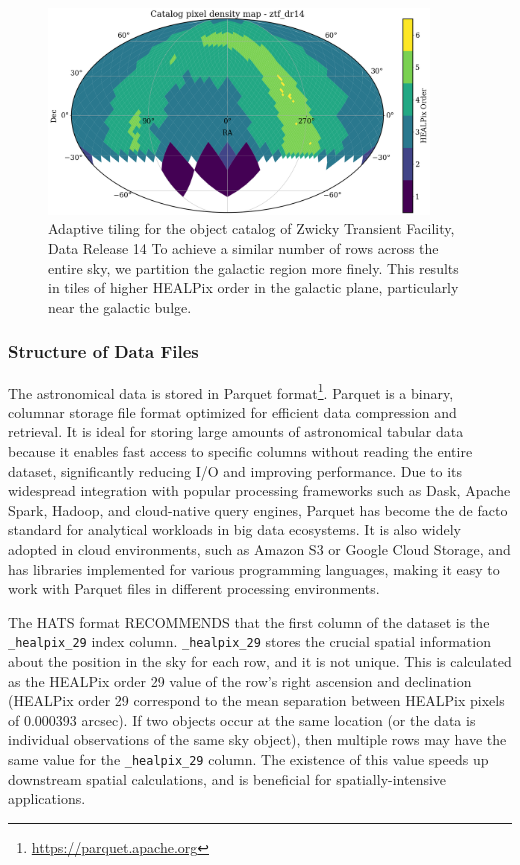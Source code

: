 \documentclass[11pt,a4paper]{ivoa}
\begin{document}
\begin{figure}
\centering
\includegraphics[width=0.9\textwidth]{order-pix.png}
\caption{Adaptive tiling for the object catalog of Zwicky Transient Facility, Data Release 14 \citep{ztf:Bellm2019, ztf:Masci2019} To achieve a similar number of rows across the entire sky, we partition the galactic region more finely. This results in tiles of higher HEALPix order in the galactic plane, particularly near the galactic bulge. }
\label{fig:order}
\end{figure}


\subsubsection{Structure of Data Files} \label{sec:parquet}
The astronomical data is stored in Parquet format\footnote{\href{https://parquet.apache.org}{https://parquet.apache.org}}.
Parquet is a binary, columnar storage file format optimized for efficient data compression and retrieval.
It is ideal for storing large amounts of astronomical tabular data because it enables fast access to specific columns without reading the entire dataset, significantly reducing I/O and improving performance.
Due to its widespread integration with popular processing frameworks such as Dask, Apache Spark, Hadoop, and cloud-native query engines, Parquet has become the de facto standard for analytical workloads in big data ecosystems.
It is also widely adopted in cloud environments, such as Amazon S3 or Google Cloud Storage, and has libraries implemented for various programming languages, making it easy to work with Parquet files in different processing environments. \par

The HATS format RECOMMENDS that the first column of the dataset is the \texttt{\_healpix\_29} index column.  
\texttt{\_healpix\_29} stores the crucial spatial information about the position in the sky for each row, and it is not unique.
This is calculated as the HEALPix order 29 value of the row's right ascension and declination (HEALPix order 29 correspond to the mean separation between HEALPix pixels of 0.000393 arcsec). 
If two objects occur at the same location (or the data is individual observations of the same sky object), then multiple rows may have the same value for the \texttt{\_healpix\_29} column.
The existence of this value speeds up downstream spatial calculations, and is beneficial for spatially-intensive applications.
\end{document}
